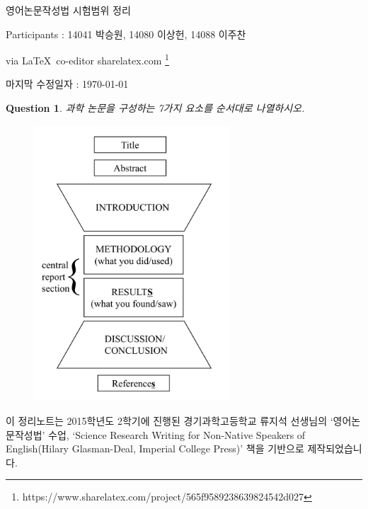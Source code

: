 \documentclass[10pt]{report}
\newtheorem{Q}{Question}
\begin{document}
	
	\begin{center}
		\Large 영어논문작성법 시험범위 정리
		\normalsize
	\end{center}
	\begin{flushright}
		Participants :  %
		14041 박승원, 14080 이상헌, 14088 이주찬
		
		via \LaTeX~co-editor sharelatex.com
		\footnote{https://www.sharelatex.com/project/565f9589238639824542d027}
		
		마지막 수정일자 : \today
	\end{flushright}
	
	\begin{Q}
		과학 논문을 구성하는 7가지 요소를 순서대로 나열하시오.
	\end{Q}
	\begin{figure}[ht]
		\centering
		\includegraphics[width=0.65\textwidth]{structure_v3.pdf}
	\end{figure}
	이 정리노트는 2015학년도 2학기에 진행된 경기과학고등학교 류지석 선생님의 `영어논문작성법' 수업, `Science Research Writing for Non-Native Speakers of English(Hilary Glasman-Deal, Imperial College Press)' 책을 기반으로 제작되었습니다.
	
\end{document}
